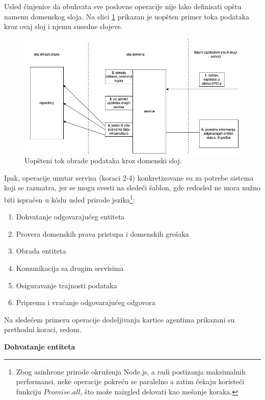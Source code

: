 \documentclass[12pt,oneside]{memoir}
\begin{document}
Usled činjenice da obuhvata sve poslovne operacije nije lako definisati opštu namenu domenskog sloja. Na slici \ref{fig:domainlayerdiagram} prikazan je uopšten primer toka podataka kroz ovaj sloj i njemu susedne slojeve.

\begin{figure}[h]
  \centering
  \includegraphics[width=1\textwidth]{docs/images/ch_2/domain.png} 
  \caption{Uopšteni tok obrade podataka kroz domenski sloj.}
  \label{fig:domainlayerdiagram}
\end{figure}

Ipak, operacije unutar servisa (koraci 2-4) konkretizovane su za potrebe sistema koji se razmatra, jer se mogu svesti na sledeći šablon, gde redosled ne mora nužno biti ispraćen u k\^{o}du usled prirode jezika\footnote{Zbog asinhrone prirode okruženja Node.js, a radi postizanja maksimalnih performansi, neke operacije pokreću se paralelno a zatim čekaju koristeći funkciju $Promise.all$, što može naizgled delovati kao mešanje koraka.}:

\begin{enumerate}
  \item Dohvatanje odgovarajućeg entiteta
  \item Provera domenskih prava pristupa i domenskih grešaka
  \item Obrada entiteta
  \item Komunikacija sa drugim servisima
  \item Osiguravanje trajnosti podataka
  \item Priprema i vraćanje odgovarajućeg odgovora
\end{enumerate}

Na sledećem primeru operacije dodeljivanja kartice agentima prikazani su prethodni koraci, redom.

\textbf{Dohvatanje entiteta}
\end{document}
